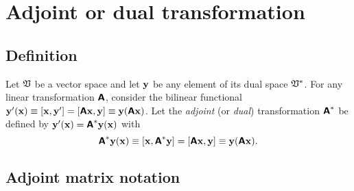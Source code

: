 \section{Adjoint or dual transformation}
\label{2014-m-fdvs-adjoint}

\subsection{Definition}

Let ${\frak V}$ be a vector space and let ${\bf y}$
be any element of its dual space ${\frak V}^\ast$.
For any linear transformation $\textsf{\textbf{A}}$, consider
the bilinear functional
${\bf y}' ({\bf x}) \equiv [{\bf x} ,{\bf y}'] =[\textsf{\textbf{A}}{\bf x},{\bf y}] \equiv {\bf y} (\textsf{\textbf{A}} {\bf x})$.
Let the {\em adjoint} (or {\em dual}) transformation $\textsf{\textbf{A}}^\ast$ be defined by
${\bf y}' ({\bf x}) = \textsf{\textbf{A}}^{\ast}{\bf y} ({\bf x})$ with
\begin{equation}
\textsf{\textbf{A}}^\ast {\bf y} ({\bf x})
\equiv
[{\bf x},\textsf{\textbf{A}}^\ast{\bf y}]
=
[\textsf{\textbf{A}}{\bf x},{\bf y}]
\equiv
{\bf y} (\textsf{\textbf{A}}{\bf x}).
\label{2016-m-ch-fdlvs-adjointop}
\end{equation}




\subsection{Adjoint matrix notation}

